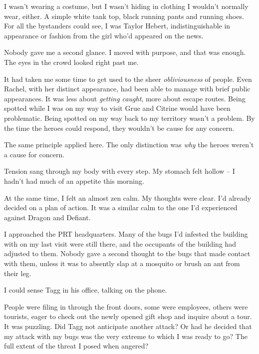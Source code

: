 I wasn't wearing a costume, but I wasn't hiding in clothing I wouldn't normally wear, either.  A simple white tank top, black running pants and running shoes.  For all the bystanders could see, I was Taylor Hebert, indistinguishable in appearance or fashion from the girl who'd appeared on the news.



Nobody gave me a second glance.  I moved with purpose, and that was enough.  The eyes in the crowd looked right past me.



It had taken me some time to get used to the sheer \emph{obliviousness} of people.  Even Rachel, with her distinct appearance, had been able to manage with brief public appearances.  It was less about \emph{getting caught}, more about escape routes.  Being spotted while I was on my way to visit Grue and Citrine would have been problematic.  Being spotted on my way back to my territory wasn't a problem.  By the time the heroes could respond, they wouldn't be cause for any concern.



The same principle applied here.  The only distinction was \emph{why} the heroes weren't a cause for concern.



Tension sang through my body with every step.  My stomach felt hollow – I hadn't had much of an appetite this morning.



At the same time, I felt an almost zen calm.  My thoughts were clear.  I'd already decided on a plan of action.  It was a similar calm to the one I'd experienced against Dragon and Defiant.



I approached the PRT headquarters.  Many of the bugs I'd infested the building with on my last visit were still there, and the occupants of the building had adjusted to them.  Nobody gave a second thought to the bugs that made contact with them, unless it was to absently slap at a mosquito or brush an ant from their leg.



I could sense Tagg in his office, talking on the phone.



People were filing in through the front doors, some were employees, others were tourists, eager to check out the newly opened gift shop and inquire about a tour.  It was puzzling.  Did Tagg not anticipate another attack?  Or had he decided that my attack with my bugs was the very extreme to which I was ready to go?  The full extent of the threat I posed when angered?



